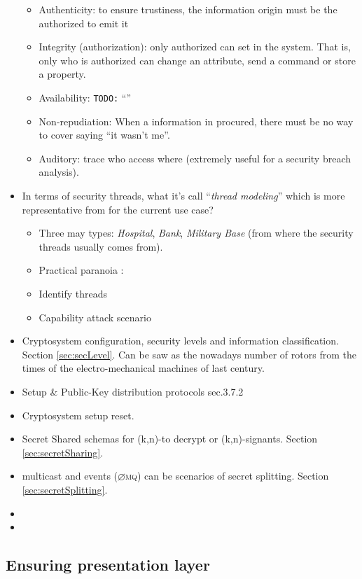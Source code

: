 \documentclass[10pt,a4paper,twoside]{llncs}
\newcommand{\todo}[1]{\texttt{\color{red}TODO:} ``\emph{#1}''}
\newcommand{\zmq}{\textsc{$\varnothing$mq}}
\begin{document}
\begin{itemize}
\begin{itemize}
        \item Authenticity: to ensure trustiness, the information origin must be the authorized to emit it
        \item Integrity (authorization): only authorized can set in the system. That is, only who is authorized can change an attribute, send a command or store a property.
        \item Availability: \todo{}
        \item Non-repudiation: When a information in procured, there must be no way to cover saying ``it wasn't me''.
        \item Auditory: trace who access where (extremely useful for a security breach analysis).
    \end{itemize}
    \item In terms of security threads, what it's call ``\emph{thread modeling}'' which is more representative from \cite{SecEngRossAnderson} for the current use case?
    \begin{itemize}
        \item Three may types: \emph{Hospital}, \emph{Bank}, \emph{Military Base} (from where the security threads usually comes from).
        \item Practical paranoia \cite{PractCryptoSchneier}:
        \item Identify threads
        \item Capability attack scenario
    \end{itemize}
    \item Cryptosystem configuration, security levels and information classification. Section \ref{sec:secLevel}. Can be saw as the nowadays number of rotors from the times of the electro-mechanical machines of last century.
    \item Setup \& Public-Key distribution protocols \cite{SecEngRossAnderson} sec.3.7.2
    \item Cryptosystem setup reset.
    \item Secret Shared schemas for (k,n)-to decrypt or (k,n)-signants. Section \ref{sec:secretSharing}.
    \item multicast and events (\zmq) can be scenarios of secret splitting. Section \ref{sec:secretSplitting}.
    \item 
    \item 
\end{itemize}

%
\subsection{Ensuring presentation layer \label{sec:presentationLayer}}
\end{document}
